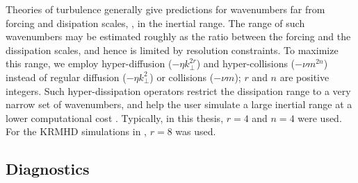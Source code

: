        Theories of turbulence generally give predictions for wavenumbers far from forcing
       and disipation scales, \ie, in the inertial range.
       The range of such wavenumbers may be estimated
       roughly as the ratio between the forcing and the dissipation scales, and hence is
       limited by resolution constraints. To maximize this range, we employ
       hyper-diffusion ($-\eta k_\perp^{2r}$) and hyper-collisions ($-\nu m^{2n}$) instead
       of regular diffusion ($-\eta k_\perp^2$) or collisions ($-\nu m$); 
       $r$ and $n$ are positive integers. Such hyper-dissipation operators restrict the
       dissipation range to a very narrow set of wavenumbers, and help the user simulate a
       large inertial range at a lower computational cost \cite{basdevant81,meneguzzi81,
       mcwilliams84,passot88jcp,borue95}. Typically, in this thesis, $r=4$ and $n=4$ were
       used. For the KRMHD simulations in , $r=8$ was used.
       
    \subsection{Diagnostics}
        
